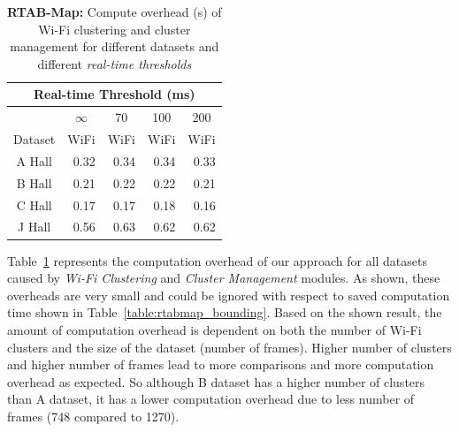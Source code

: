 
\begin{table}
\caption{{\bf RTAB-Map:} Compute overhead (s) of {Wi-Fi clustering} and {cluster management} for different datasets and different {\it real-time thresholds}}
\begin{center}
\begin{tabular}{| c | r | r | r | r | } 
\hline 
\multicolumn{5}{|c|}{Real-time Threshold (ms)} \\ 
\hline 
 & \multicolumn{1}{|c|}{$\infty$} & \multicolumn{1}{|c|}{70} & \multicolumn{1}{|c|}{100} & \multicolumn{1}{|c|}{200} \\ 
\hline 
 {Dataset} & \multicolumn{1}{|c|}{WiFi} & \multicolumn{1}{|c|}{WiFi} & \multicolumn{1}{|c|}{WiFi} & \multicolumn{1}{|c|}{WiFi} \\ 
\hline 
 A Hall & 0.32 & 0.34 & 0.34 & 0.33 \\ 
 B Hall & 0.21 & 0.22 & 0.22 & 0.21 \\ 
 C Hall & 0.17 & 0.17 & 0.18 & 0.16 \\ 
 J Hall & 0.56 & 0.63 & 0.62 & 0.62 \\ 
\hline 
\end{tabular} 
\label{table:rtabmap_overhead}
\end{center}
\end{table}
Table~\ref{table:rtabmap_overhead} represents the computation overhead of our approach for all datasets caused by {\it Wi-Fi Clustering} and {\it Cluster Management} modules. 
As shown, these overheads are very small and could be ignored with respect to saved computation time shown in Table~\ref{table:rtabmap_bounding}. 
Based on the shown result, the amount of computation overhead is dependent on both the number of Wi-Fi clusters and the size of the dataset (number of frames). 
Higher number of clusters and higher number of frames lead to more comparisons and more computation overhead as expected. 
So although B dataset has a higher number of clusters than A dataset, it has a lower computation overhead due to less number of frames (748 compared to 1270).

